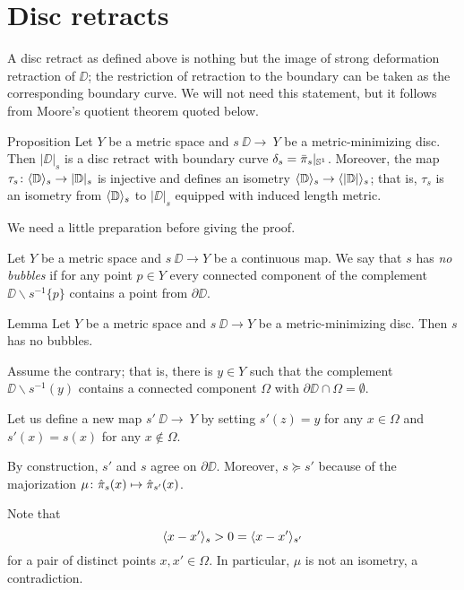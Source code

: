 \section{Disc retracts}\label{Metric-minimizing discs}

A disc retract as defined above is nothing but the image of strong deformation retraction of $\DD$;
the restriction of retraction to the boundary can be taken as the corresponding boundary curve.
We will not need this statement, but it follows from Moore's quotient theorem quoted below. 

\begin{thm}{Proposition}\label{prop:|D|}
Let $Y$ be a metric space and $s\:\DD\to\ Y$ be a metric-minimizing disc.
Then $|\DD|_s$ is a disc retract with boundary curve $\delta_s=\bar\pi_s|_{\mathbb{S}^1}$.
Moreover, the map $\tau_s\colon\langle\mathbb{D}\rangle_s\to |\mathbb{D}|_s$ is injective and defines an isometry
$\<\DD\>_s\zz\to \<|\DD|\>_s$;
that is, $\tau_s$ is an isometry from $\langle\mathbb{D}\rangle_s$ to $|\DD|_s$ equipped with induced length metric.
\end{thm}

We need a little preparation before giving the proof.

Let $Y$ be a metric space and
$s\:\DD\to Y$ be a continuous map.
We say that $s$ has \label{page:no-bubble}\emph{no bubbles}
if for any point $p\in Y$ every connected component of the complement $\DD\backslash s^{-1}\{p\}$ contains a point from $\partial \DD$.

\begin{thm}{Lemma}\label{prop:point-complement}
Let $Y$ be a metric space and $s\:\DD\to Y$ be a metric-minimizing disc.
Then $s$ has no bubbles.
\end{thm}

Assume the contrary;
that is, there is $y\in Y$ such that the complement $\DD\backslash s^{-1}(y)$ contains a connected component $\Omega$ with $\partial \DD\cap \Omega=\emptyset$.

Let us define a new map $s'\:\DD\to\ Y$ by setting $s'(z)=y$ for any $x\in \Omega$ and $s'(x)=s(x)$ for any $x\notin \Omega$.

By construction, $s'$ and $s$ agree on $\partial\DD$. Moreover, $s\succcurlyeq s'$
because of the majorization $\mu\:\hat\pi_s(x)\zz\mapsto \hat\pi_{s'}(x)$.

Note that
\[\langle x-x'\rangle_{s}>0=\langle x-x'\rangle_{s'}\]
for a pair of distinct points $x,x'\in \Omega$.
In particular, $\mu$ is not an isometry, a contradiction.
\qeds



